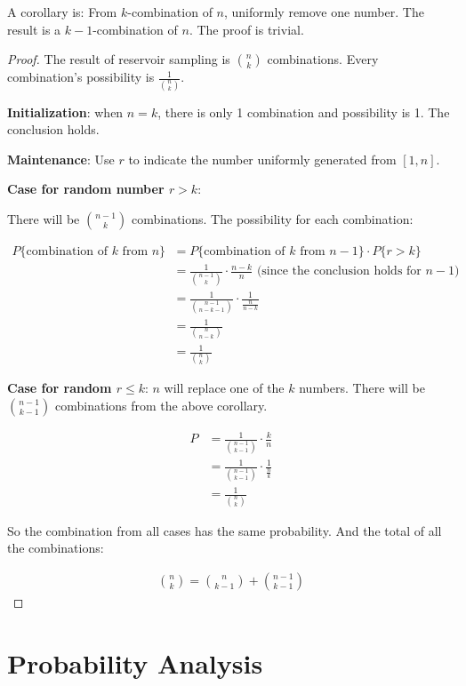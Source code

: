 \documentclass{book}
\begin{document}
A corollary is: From $k$-combination of $n$, uniformly remove one number. The result is a
$k-1$-combination of $n$. The proof is trivial.

\begin{proof}

The result of reservoir sampling is $\binom{n}{k}$ combinations. Every combination's possibility is
$\frac{1}{\binom{n}{k}}$.

\textbf{Initialization}: when $n = k$, there is only 1 combination and possibility is
1. The conclusion holds.

\textbf{Maintenance}: Use $r$ to indicate the number uniformly generated  from $[1, n]$.

\textbf{Case for random number $r > k$}:

There will be $\binom{n-1}{k}$ combinations. The possibility for each
combination:

\begin{align*}
P \{\text{combination of }k\text{ from }n\}
& = P \{\text{combination of }k\text{ from }n-1\} \cdot P\{r > k\} \\
& = \frac{1}{\binom{n-1}{k}} \cdot \frac{n-k}{n} \text{ (since the conclusion holds for $n-1$)} \\
& = \frac{1}{\binom{n-1}{n-k-1}} \cdot \frac{1}{\frac{n}{n-k}} \\
& = \frac{1}{\binom{n}{n-k}} \\
& = \frac{1}{\binom{n}{k}}
\end{align*}

\textbf{Case for random $r \le k$}: $n$ will replace one of the $k$ numbers.
There will be $\binom{n-1}{k-1}$ combinations from the above corollary.

\begin{align*}
  P &= \frac{1}{\binom{n-1}{k-1}} \cdot \frac{k}{n} \\
    &= \frac{1}{\binom{n-1}{k-1}} \cdot \frac{1}{\frac{n}{k}} \\
    &= \frac{1}{\binom{n}{k}}
\end{align*}

So the combination from all cases has the same probability. And the total of all
the combinations:

\begin{align*}
\binom{n}{k} = \binom{n}{k-1} + \binom{n-1}{k-1}
\end{align*}


\end{proof}

\chapter{Probability Analysis}
\end{document}

